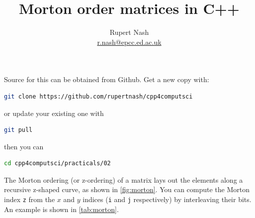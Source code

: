 \documentclass{article}
\title{Morton order matrices in C++}
\author{Rupert Nash \\ \url{r.nash@epcc.ed.ac.uk}}
\newcommand{\code}[1]{\lstinline!#1!}
\begin{document}
\maketitle{}

Source for this can be obtained from Github. Get a new copy with:
\begin{lstlisting}[language=bash]
git clone https://github.com/rupertnash/cpp4computsci
\end{lstlisting}
or update your existing one with
\begin{lstlisting}[language=bash]
git pull
\end{lstlisting}
then you can 
\begin{lstlisting}[language=bash]
cd cpp4computsci/practicals/02
\end{lstlisting}


The Morton ordering (or z-ordering) of a matrix lays out the elements
along a recursive z-shaped curve, as shown in
\autoref{fig:morton}. You can compute the Morton index \code{z} from
the $x$ and $y$ indices (\code{i} and \code{j} respectively) by
interleaving their bits. An example is shown in
\autoref{tab:morton}.
\end{document}
